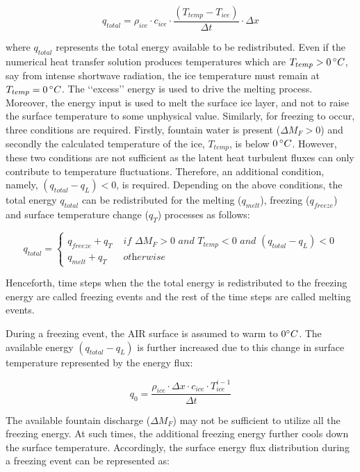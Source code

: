 $$q_{total} =\rho_{ice} \cdot c_{ice} \cdot \frac{(T_{temp}-T_{ice})}{\Delta t} \cdot \Delta x$$

where $q_{total}$ represents the total energy available to be redistributed. Even if the numerical heat transfer
solution produces temperatures which are $T_{temp}>0\, ^{\circ} C$, say from intense shortwave radiation, the ice
temperature must remain at $T_{temp} = 0\, ^{\circ} C$. The ‘‘excess’’ energy is used to drive the melting
process. Moreover, the energy input is used to melt the surface ice layer, and not to raise the surface
temperature to some unphysical value. Similarly, for freezing to occur, three conditions are required. Firstly,
fountain water is present ($\Delta M_{F} > 0 $) and secondly the calculated temperature of the ice, $T_{temp}$,
is below $0\, ^{\circ} C$. However, these two conditions are not sufficient as the latent heat turbulent fluxes
can only contribute to temperature fluctuations. Therefore, an additional condition, namely, $(q_{total}-q_{L})
< 0$, is required. Depending on the above conditions, the total energy $q_{total}$ can be redistributed
for the melting ($q_{melt}$), freezing ($q_{freeze}$) and surface temperature change ($q_{T}$) processes as
follows:

\begin{equation}
	q_{total} = \left\{ \begin{array}{ll}
		q_{freeze} + q_{T} & \textit{ if } \Delta M_{F} > 0 \textit{ and } T_{temp} < 0 \textit{ and }(q_{total}-q_{L}) < 0 \\
		q_{melt} + q_{T}   & \textit{ otherwise}
	\end{array} \right.
\end{equation}

Henceforth, time steps when the the total energy is redistributed to the freezing energy are called freezing
events and the rest of the time steps are called melting events.


During a freezing event, the AIR surface is assumed to warm to $0 ^{\circ} C$. The available energy
$(q_{total}-q_{L})$ is further increased due to this change in surface temperature represented by the energy
flux:

$$q_{0} = \frac{\rho_{ice} \cdot \Delta x \cdot c_{ice} \cdot T_{ice}^{i-1}}{\Delta t}$$

The available fountain discharge ($\Delta M_{F}$) may not be sufficient to utilize all the freezing energy. At such times, 
the additional freezing energy further cools down the surface temperature. Accordingly, the surface energy flux
distribution during a freezing event can be represented as:

